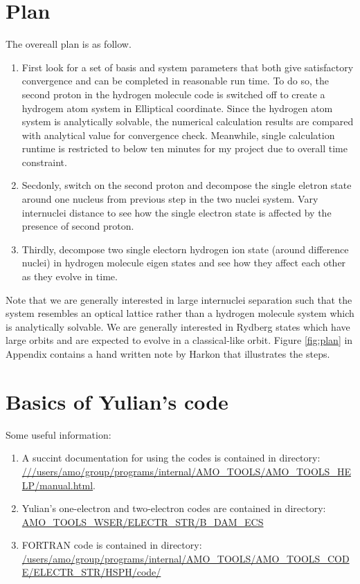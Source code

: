 \documentclass [11pt,a4paper]{report}
\begin{document}
\section{Plan}
\label{sec:plan}
The overeall plan is as follow.
\begin{enumerate}
  \item First look for a set of basis and system parameters that both give satisfactory convergence and can be completed in reasonable run time. To do so, the second proton in the hydrogen molecule code is switched off to create a hydrogem atom system in Elliptical coordinate. Since the hydrogen atom system is analytically solvable, the numerical calculation results are compared with analytical value for convergence check. Meanwhile, single calculation runtime is restricted to below ten minutes for my project due to overall time constraint.
  \item Secdonly, switch on the second proton and decompose the single eletron state around one nucleus from previous step in the two nuclei system. Vary internuclei distance to see how the single electron state is affected by the presence of second proton.
  \item Thirdly, decompose two single electorn hydrogen ion state (around difference nuclei) in hydrogen molecule eigen states and see how they affect each other as they evolve in time.
\end{enumerate}

Note that we are generally interested in large internuclei separation such that the system resembles an optical lattice rather than a hydrogen molecule system which is analytically solvable. We are generally interested in Rydberg states which have large orbits and are expected to evolve in a classical-like orbit. Figure \ref{fig:plan} in Appendix contains a hand written note by Harkon that illustrates the steps.

%
%
\section{Basics of Yulian's code}
\label{sec:code_basics}
Some useful information:
\begin{enumerate}
  \item A succint documentation for using the codes is contained in directory: \url{///users/amo/group/programs/internal/AMO_TOOLS/AMO_TOOLS_HELP/manual.html}.
  \item Yulian's one-electron and two-electron codes are contained in directory: \url{AMO_TOOLS_WSER/ELECTR_STR/B_DAM_ECS}
  \item FORTRAN code is contained in directory: \url{/users/amo/group/programs/internal/AMO_TOOLS/AMO_TOOLS_CODE/ELECTR_STR/HSPH/code/}
\end{enumerate}
\end{document}
